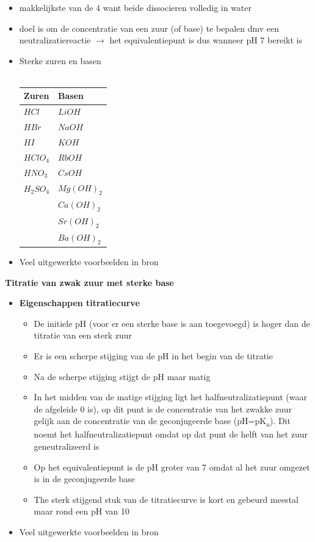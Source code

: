 \documentclass[10pt]{report}
\begin{document}
\begin{itemize}
    \item makkelijkste van de 4 want beide dissocieren volledig in water
    \item doel is om de concentratie van een zuur (of base) te bepalen dmv een neutralizatiereactie $\rightarrow$ het equivalentiepunt is dus wanneer pH 7 bereikt is
    \item Sterke zuren en basen\\\\
        \begin{tabular}{|l|l|}
            \hline
            Zuren & Basen \\\hline
            $HCl$ & $LiOH$ \\\hline
            $HBr$ & $NaOH$ \\\hline
            $HI$ & $KOH$ \\\hline
            $HClO_4$ & $RbOH$ \\\hline
            $HNO_3$ & $CsOH$ \\\hline
            $H_2SO_4$ & $Mg(OH)_2$ \\\hline
            & $Ca(OH)_2$ \\\hline
            & $Sr(OH)_2$ \\\hline
            & $Ba(OH)_2$ \\\hline
        \end{tabular}
        \item Veel uitgewerkte voorbeelden in bron
\end{itemize}
\textbf{Titratie van zwak zuur met sterke base}
\begin{itemize}
    \item \textbf{Eigenschappen titratiecurve}
        \begin{itemize}
            \item De initiele pH (voor er een sterke base is aan toegevoegd) is hoger dan de titratie van een sterk zuur
            \item Er is een scherpe stijging van de pH in het begin van de titratie
            \item Na de scherpe stijging stijgt de pH maar matig
            \item In het midden van de matige stijging ligt het halfneutralizatiepunt (waar de afgeleide 0 is), op dit punt is de concentratie van het zwakke zuur gelijk aan de concentratie van de geconjugeerde base (pH=pK\textsubscript{a}). Dit noemt het halfneutralizatiepunt omdat op dat punt de helft van het zuur geneutralizeerd is
            \item Op het equivalentiepunt is de pH groter van 7 omdat al het zuur omgezet is in de geconjugeerde base
            \item The sterk stijgend stuk van de titratiecurve is kort en gebeurd meestal maar rond een pH van 10
        \end{itemize}
    \item Veel uitgewerkte voorbeelden in bron
\end{itemize}
\end{document}
